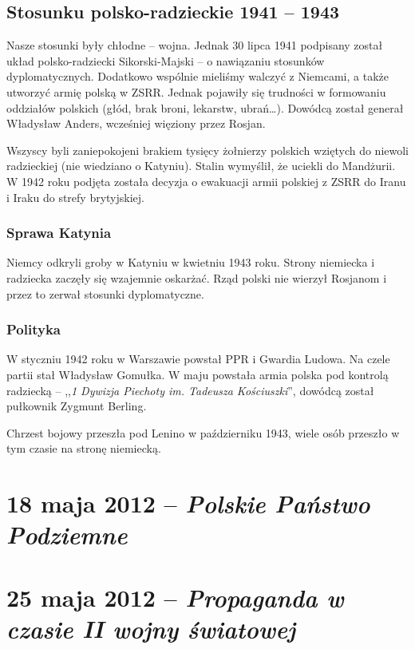 \documentclass [a4paper, 11pt, oneside]{book}
\begin{document}
\section{Stosunku polsko-radzieckie 1941 -- 1943} %
\label{sec:stosunku_polsko_radzieckie_1941_1943}
    Nasze stosunki były chłodne -- wojna. Jednak 30 lipca 1941 podpisany został układ polsko-radziecki Sikorski-Majski -- o nawiązaniu stosunków dyplomatycznych. Dodatkowo wspólnie mieliśmy walczyć z Niemcami, a także utworzyć armię polską w ZSRR. Jednak pojawiły się trudności w formowaniu oddziałów polskich (głód, brak broni, lekarstw, ubrań\dots). Dowódcą został generał Władysław Anders, wcześniej więziony przez Rosjan.

    Wszyscy byli zaniepokojeni brakiem tysięcy żołnierzy polskich wziętych do niewoli radzieckiej (nie wiedziano o Katyniu). Stalin wymyślił, że uciekli do Mandżurii. W 1942 roku podjęta została decyzja o ewakuacji armii polskiej z ZSRR do Iranu i Iraku do strefy brytyjskiej.
    \subsection{Sprawa Katynia} %
    \label{sub:sprawa_katynia}
        Niemcy odkryli groby w Katyniu w kwietniu 1943 roku. Strony niemiecka i radziecka zaczęły się wzajemnie oskarżać. Rząd polski nie wierzył Rosjanom i przez to zerwał stosunki dyplomatyczne.
    \subsection{Polityka} %
    \label{sub:polityka}
        W styczniu 1942 roku w Warszawie powstał PPR i Gwardia Ludowa. Na czele partii stał Władysław Gomułka. W maju powstała armia polska pod kontrolą radziecką -- ,,\emph{1 Dywizja Piechoty im. Tadeusza Kościuszki}'', dowódcą został pułkownik Zygmunt Berling.

        Chrzest bojowy przeszła pod Lenino w październiku 1943, wiele osób przeszło w tym czasie na stronę niemiecką.
\chapter{18 maja 2012 -- \textit{Polskie Państwo Podziemne}} %
\label{cha:18_maja_2012_textit}
    
\chapter{25 maja 2012 -- \textit{Propaganda w czasie II wojny światowej}} %
\label{cha:25_maja_2012_textit_propaganda_w_czasie_ii_wojny_wiatowej}

\end{document}
